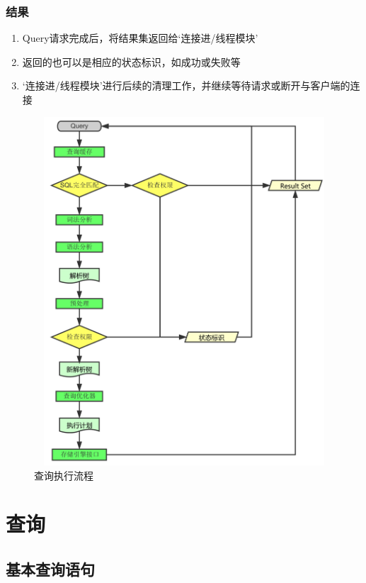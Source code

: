 \documentclass[UTF8,a4paper,12pt]{ctexbook}
\begin{document}
		\subsection{结果}
			\begin{enumerate}
				\item Query请求完成后，将结果集返回给‘连接进/线程模块’
				\item 返回的也可以是相应的状态标识，如成功或失败等
				\item ‘连接进/线程模块’进行后续的清理工作，并继续等待请求或断开与客户端的连接
			\end{enumerate}
			
			\begin{figure}[H]
				\centering
				\includegraphics[width=17cm,height=13cm]{mysqlProcess}
				\caption{查询执行流程}
			\end{figure}
			
\chapter{查询}
	\section{基本查询语句}
\end{document}
